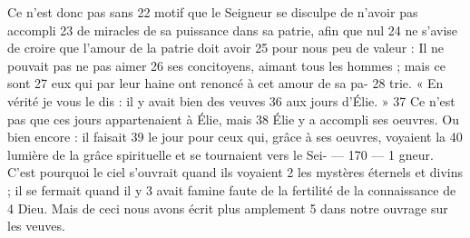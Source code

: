 Ce n'est donc pas sans	 
22	 	motif que le Seigneur se disculpe de n'avoir pas accompli	 
23	 	de miracles de sa puissance dans sa patrie, afin que nul	 
24	 	ne s'avise de croire que l'amour de la patrie doit avoir	 
25	 	pour nous peu de valeur : Il ne pouvait pas ne pas aimer	 
26	 	ses concitoyens, aimant tous les hommes ; mais ce sont	 
27	 	eux qui par leur haine ont renoncé à cet amour de sa pa-	 
28	 	trie.
« En vérité je vous le dis : il y avait bien des veuves	 
36	 	aux jours d'Élie. »	 
37	 	Ce n'est pas que ces jours appartenaient à Élie, mais	 
38	 	Élie y a accompli ses oeuvres. Ou bien encore : il faisait	 
39	 	le jour pour ceux qui, grâce à ses oeuvres, voyaient la	 
40	 	lumière de la grâce spirituelle et se tournaient vers le Sei-	 
 	--- 170 ---	 
1	 	gneur. C'est pourquoi le ciel s'ouvrait quand ils voyaient	 
2	 	les mystères éternels et divins ; il se fermait quand il y	 
3	 	avait famine faute de la fertilité de la connaissance de	 
4	 	Dieu.
Mais de ceci nous avons écrit plus amplement	 
5	 	dans notre ouvrage sur les veuves.
